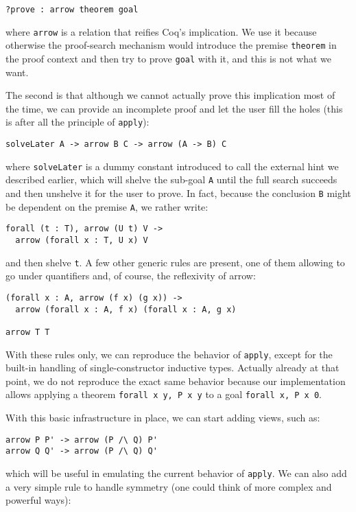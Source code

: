 \documentclass[nocopyrightspace,blockstyle,numbers]{sigplanconf}
\begin{document}
\begin{verbatim}
?prove : arrow theorem goal
\end{verbatim}
where \texttt{arrow} is a relation that reifies Coq's implication.
We use it because otherwise the proof-search mechanism would introduce
the premise \texttt{theorem} in the proof context and then try
to prove \texttt{goal} with it, and this is not what we want.

The second is that although we cannot actually prove this implication
most of the time, we can provide an incomplete proof and let the
user fill the holes (this is after all the principle of
\texttt{apply}):

\begin{verbatim}
solveLater A -> arrow B C -> arrow (A -> B) C
\end{verbatim}
where \texttt{solveLater} is a dummy constant introduced to call the
external hint we described earlier, which will shelve the sub-goal
\texttt{A} until the full search succeeds and then unshelve it for the
user to prove. In fact, because the conclusion \texttt{B} might be
dependent on the premise \texttt{A}, we rather write:

\begin{verbatim}
forall (t : T), arrow (U t) V ->
  arrow (forall x : T, U x) V
\end{verbatim}
and then shelve \texttt{t}.
A few other generic rules are present, one of them allowing to
go under quantifiers and, of course, the reflexivity of arrow:

\begin{verbatim}
(forall x : A, arrow (f x) (g x)) ->
  arrow (forall x : A, f x) (forall x : A, g x)

arrow T T
\end{verbatim}

With these rules only, we can reproduce the behavior of
\texttt{apply}, except for the built-in handling of
single-constructor inductive types.
Actually already at that point, we do not reproduce the
exact same behavior because our implementation allows
applying a theorem \texttt{forall x y, P x y}
to a goal \texttt{forall x, P x 0}.

With this basic infrastructure in place, we can start
adding views, such as:

\begin{verbatim}
arrow P P' -> arrow (P /\ Q) P'
arrow Q Q' -> arrow (P /\ Q) Q'
\end{verbatim}
which will be useful in emulating the current behavior
of \texttt{apply}. We can also add a very simple rule to
handle symmetry (one could think of more complex and
powerful ways):
\end{document}
